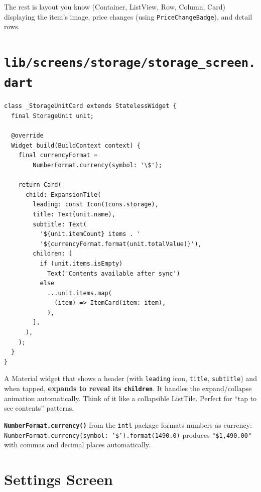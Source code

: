 \documentclass[11pt, a4paper]{article}
\begin{document}
The rest is layout you know (Container, ListView, Row, Column, Card) displaying the item's image, price changes (using \texttt{PriceChangeBadge}), and detail rows.

\newpage

\section{\texttt{lib/screens/storage/storage\_screen.dart}}

\begin{lstlisting}
class _StorageUnitCard extends StatelessWidget {
  final StorageUnit unit;

  @override
  Widget build(BuildContext context) {
    final currencyFormat =
        NumberFormat.currency(symbol: '\$');

    return Card(
      child: ExpansionTile(
        leading: const Icon(Icons.storage),
        title: Text(unit.name),
        subtitle: Text(
          '${unit.itemCount} items . '
          '${currencyFormat.format(unit.totalValue)}'),
        children: [
          if (unit.items.isEmpty)
            Text('Contents available after sync')
          else
            ...unit.items.map(
              (item) => ItemCard(item: item),
            ),
        ],
      ),
    );
  }
}
\end{lstlisting}

\begin{conceptbox}[title=\textbf{ExpansionTile}]
A Material widget that shows a header (with \texttt{leading} icon, \texttt{title}, \texttt{subtitle}) and when tapped, \textbf{expands to reveal its \texttt{children}}. It handles the expand/collapse animation automatically. Think of it like a collapsible ListTile. Perfect for ``tap to see contents'' patterns.
\end{conceptbox}

\textbf{\texttt{NumberFormat.currency()}} from the \texttt{intl} package formats numbers as currency: \texttt{NumberFormat.currency(symbol: '\$').format(1490.0)} produces \texttt{"\$1,490.00"} with commas and decimal places automatically.

\newpage

\section{Settings Screen}
\end{document}
